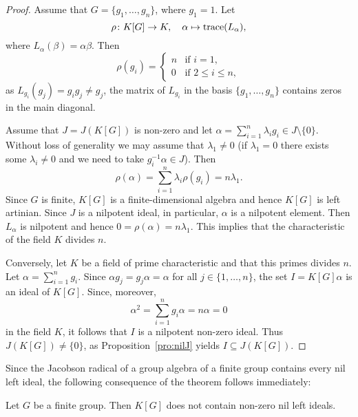 \begin{proof}
	Assume that $G=\{g_1,\dots,g_n\}$, where $g_1=1$. Let 
	\[
	\rho\colon K[G]\to K,
	\quad
	\alpha\mapsto\operatorname{trace}(L_{\alpha}),
	\]
	where 
	$L_{\alpha}(\beta)=\alpha\beta$. Then 
	\[
	\rho(g_i)=\begin{cases}
	    n & \text{if $i=1$,}\\
	    0 & \text{if $2\leq i\leq n$},
	\end{cases}
	\]
	as $L_{g_i}(g_j)=g_{i}g_j\ne g_j$, the matrix of 
	$L_{g_i}$ in the basis $\{g_1,\dots,g_n\}$ contains zeros in the main diagonal. 

	Assume that $J=J(K[G])$ is non-zero and let 
	$\alpha=\sum_{i=1}^n\lambda_ig_i\in J\setminus\{0\}$. Without loss of generality
	we may assume that $\lambda_1\ne 0$ (if $\lambda_1=0$ there exists some 
	$\lambda_i\ne 0$ and we need to take $g_i^{-1}\alpha\in J$). Then 
	\[
		\rho(\alpha)=\sum_{i=1}^n \lambda_i\rho(g_i)=n\lambda_1.
	\]
	Since $G$ is finite, $K[G]$ is a finite-dimensional algebra and hence 
	$K[G]$ is left artinian. Since $J$ is a nilpotent ideal, 
	in particular, $\alpha$ is a nilpotent element. Then 
	$L_{\alpha}$ is nilpotent and hence $0=\rho(\alpha)=n\lambda_1$. This implies that
	the characteristic of the field $K$ divides $n$. 

	Conversely, let $K$ be a field of prime characteristic and that this primes divides 
	$n$. Let $\alpha=\sum_{i=1}^ng_i$. Since $\alpha
	g_j=g_j\alpha=\alpha$ for all $j\in\{1,\dots,n\}$, the set 
	$I=K[G]\alpha$ is an ideal of $K[G]$. Since, moreover,   
	\[
		\alpha^2=\sum_{i=1}^n g_i\alpha=n\alpha=0
	\]
	in the field $K$, it follows that $I$ is a nilpotent non-zero ideal. Thus $J(K[G])\ne\{0\}$, 
	as Proposition~\ref{pro:nilJ} yields $I\subseteq J(K[G])$.
\end{proof}

Since the Jacobson radical of a group algebra of a finite group contains 
every nil left ideal, the following consequence of the theorem follows immediately:

\begin{corollary}
	\label{cor:GfinitoNOnil}
	Let $G$ be a finite group. Then $K[G]$ does not contain non-zero nil left ideals. 
\end{corollary}



